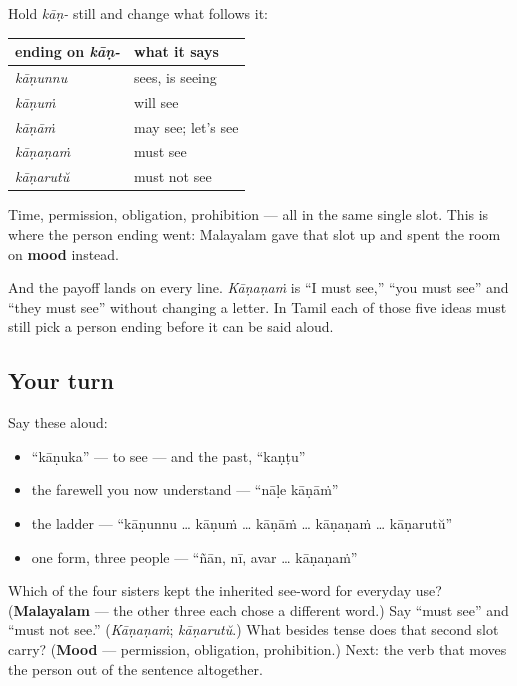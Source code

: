 \begin{grammarlens}[title={Grammar Lens: tense is only one thing that ending can be}]
Hold \emph{kāṇ-} still and change what follows it:

\noindent
\begin{tabularx}{\linewidth}{@{}>{\raggedright\arraybackslash}X>{\raggedright\arraybackslash}X@{}}
\toprule
\textbf{ending on \emph{kāṇ-}} & \textbf{what it says} \\
\midrule
\emph{kāṇunnu} & sees, is seeing \\
\emph{kāṇuṁ} & will see \\
\emph{kāṇāṁ} & may see; let's see \\
\emph{kāṇaṇaṁ} & must see \\
\emph{kāṇarutŭ} & must not see \\
\bottomrule
\end{tabularx}

Time, permission, obligation, prohibition — all in the same single slot. This is where the person ending went: Malayalam gave that slot up and spent the room on \textbf{mood} instead.

And the payoff lands on every line. \emph{Kāṇaṇaṁ} is \textquotedblleft{}I must see,\textquotedblright{} \textquotedblleft{}you must see\textquotedblright{} and \textquotedblleft{}they must see\textquotedblright{} without changing a letter. In Tamil each of those five ideas must still pick a person ending before it can be said aloud.
\end{grammarlens}

\subsection*{Your turn}
Say these aloud:

\begin{itemize}
\raggedright
  \item \textquotedblleft{}kāṇuka\textquotedblright{} — to see — and the past, \textquotedblleft{}kaṇṭu\textquotedblright{}
  \item the farewell you now understand — \textquotedblleft{}nāḷe kāṇāṁ\textquotedblright{}
  \item the ladder — \textquotedblleft{}kāṇunnu … kāṇuṁ … kāṇāṁ … kāṇaṇaṁ … kāṇarutŭ\textquotedblright{}
  \item one form, three people — \textquotedblleft{}ñān, nī, avar … kāṇaṇaṁ\textquotedblright{}
\end{itemize}

\begin{tcolorbox}[breakable,colback=teal!4,colframe=teal!35!black,title={Before you move on}]
Which of the four sisters kept the inherited see-word for everyday use? (\textbf{Malayalam} — the other three each chose a different word.) Say \textquotedblleft{}must see\textquotedblright{} and \textquotedblleft{}must not see.\textquotedblright{} (\emph{Kāṇaṇaṁ}; \emph{kāṇarutŭ}.) What besides tense does that second slot carry? (\textbf{Mood} — permission, obligation, prohibition.) Next: the verb that moves the person out of the sentence altogether.
\end{tcolorbox}
